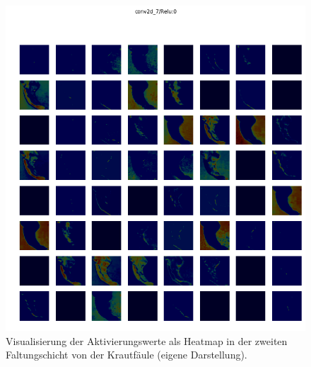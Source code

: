 \begin{figure}[h!]
	\centering
	\includegraphics[width=\textwidth]{visualisierungen/late/heatmap_mit/conv2d_7.png}
	\caption{Visualisierung der Aktivierungswerte als Heatmap in der zweiten Faltungschicht von der Krautfäule (eigene Darstellung).}
	\label{}
\end{figure}

